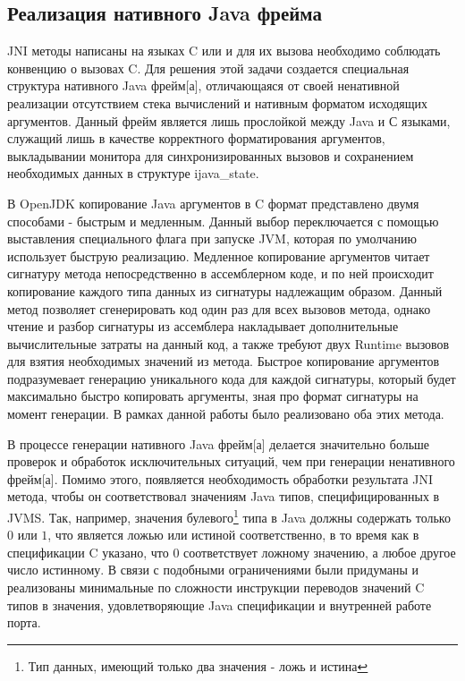 \subsection{Реализация нативного Java фрейма}
JNI \gls{метод}ы написаны на языках C или \cpp и для их вызова необходимо соблюдать конвенцию о вызовах C. Для решения этой задачи создается специальная структура нативного Java \gls{фрейм}[а], отличающаяся от своей ненативной реализации отсутствием стека вычислений и нативным форматом исходящих аргументов. Данный \gls{фрейм} является лишь прослойкой между Java и С языками, служащий лишь в качестве корректного форматирования аргументов, выкладывании монитора для синхронизированных вызовов и сохранением необходимых данных в структуре ijava\_state.




В OpenJDK копирование Java аргументов в C формат представлено двумя способами - быстрым и медленным. Данный выбор переключается с помощью выставления специального флага при запуске JVM, которая по умолчанию использует быструю реализацию. Медленное копирование аргументов читает сигнатуру \gls{метод}а непосредственно в ассемблерном коде, и по ней происходит копирование каждого типа данных из сигнатуры надлежащим образом. Данный \gls{метод} позволяет сгенерировать код один раз для всех вызовов \gls{метод}а, однако чтение и разбор сигнатуры из ассемблера накладывает дополнительные вычислительные затраты на данный код, а также требуют двух Runtime вызовов для взятия необходимых значений из \gls{метод}а. Быстрое копирование аргументов подразумевает генерацию уникального кода для каждой сигнатуры, который будет максимально быстро копировать аргументы, зная про формат сигнатуры на момент генерации. В рамках данной работы было реализовано оба этих \gls{метод}а.

В процессе генерации нативного Java \gls{фрейм}[а] делается значительно больше проверок и обработок исключительных ситуаций, чем при генерации ненативного \gls{фрейм}[а]. Помимо этого, появляется необходимость обработки результата JNI \gls{метод}а, чтобы он соответствовал значениям Java типов, специфицированных в JVMS. Так, например, значения булевого\footnote{Тип данных, имеющий только два значения - ложь и истина} типа в Java должны содержать только $0$ или $1$, что является ложью или истиной соответственно, в то время как в спецификации C указано, что $0$ соответствует ложному значению, а любое другое число истинному. В связи с подобными ограничениями были придуманы и реализованы минимальные по сложности инструкции переводов значений C типов в значения, удовлетворяющие Java спецификации и внутренней работе порта.

